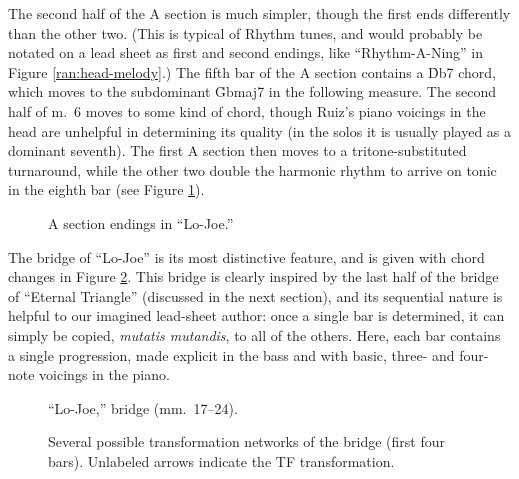 The second half of the A section is much simpler, though the first ends
differently than the other two. (This is typical of Rhythm tunes, and would
probably be notated on a lead sheet as first and second endings, like
``Rhythm-A-Ning'' in Figure \ref{ran:head-melody}.) The fifth bar of the A
section contains a \h{Db7} chord, which moves to the subdominant \h{Gbmaj7} in
the following measure. The second half of m.~6 moves to some kind of \Cflat
chord, though Ruiz's piano voicings in the head are unhelpful in determining
its quality (in the solos it is usually played as a dominant seventh). The
first A section then moves to a tritone-substituted turnaround, while the
other two double the harmonic rhythm to arrive on tonic in the eighth bar
(see Figure \ref{lj:a-sect-endings}).

\begin{figure}[tbp]
  \caption{A section endings in ``Lo-Joe.''}
  \label{lj:a-sect-endings}
\end{figure}

The bridge of ``Lo-Joe'' is its most distinctive feature, and is given with
chord changes in Figure \ref{lj:bridge}. This bridge is clearly inspired by
the last half of the bridge of ``Eternal Triangle'' (discussed in the next
section), and its sequential nature is helpful to our imagined lead-sheet
author: once a single bar is determined, it can simply be copied,
\emph{mutatis mutandis}, to all of the others. Here, each bar contains a
single \tf progression, made explicit in the bass and with basic, three- and
four-note voicings in the piano.

\begin{figure}[tbp]
  \caption{``Lo-Joe,'' bridge (mm.~17--24).}
  \label{lj:bridge}
\end{figure}

\begin{figure}[tbp]
  \caption[Several possible transformation networks of the bridge.]{%
    Several possible transformation networks of the bridge (first four bars).
    Unlabeled arrows indicate the TF transformation.}
  \label{lj:bridge-trans}
\end{figure}

